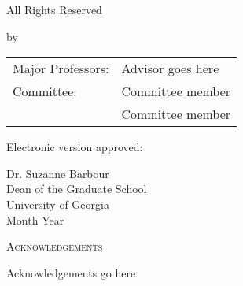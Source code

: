 \documentclass[dissertation.tex]{subfiles}
\newcommand{\mynamesc}{\textsc{\myname}}
\begin{document}
All Rights Reserved

\myname

\endgroup
\pagebreak


\begingroup
\thispagestyle{empty}
\vspace*{1cm}
\centering
\Large \mytitle

\vspace{1cm}
\large by

\vspace{1cm}
\mynamesc

\endgroup


\vspace{\fill}
\normalsize
\hspace{\fill}
\begin{tabular}{l l}
Major Professors:   &   {Advisor goes here} \\
Committee:          &   {Committee member} \\
                    &   {Committee member}
\end{tabular}

\vspace{1cm}
\noindent
Electronic version approved:

\noindent
Dr. Suzanne Barbour\\
Dean of the Graduate School\\
University of Georgia\\
{Month} {Year}
\pagebreak

\vspace*{1cm}
\begin{center}
\Large \textsc{Acknowledgements}
\end{center}

\normalsize

{Acknowledgements go here}

\pagebreak

\tableofcontents
\pagebreak

\end{document}

